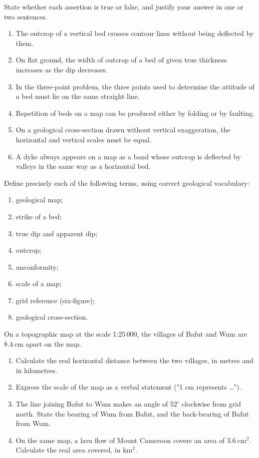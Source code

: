 \documentclass[11pt]{article}
\begin{document}
\begin{exercice}
State whether each assertion is true or false, and justify your answer in one or two sentences.
\begin{enumerate}
\item The outcrop of a vertical bed crosses contour lines without being deflected by them.
\item On flat ground, the width of outcrop of a bed of given true thickness increases as the dip decreases.
\item In the three-point problem, the three points used to determine the attitude of a bed must lie on the same straight line.
\item Repetition of beds on a map can be produced either by folding or by faulting.
\item On a geological cross-section drawn without vertical exaggeration, the horizontal and vertical scales must be equal.
\item A dyke always appears on a map as a band whose outcrop is deflected by valleys in the same way as a horizontal bed.
\end{enumerate}
\end{exercice}

\begin{exercice}[Definitions]
Define precisely each of the following terms, using correct geological vocabulary:
\begin{enumerate}
\item geological map;
\item strike of a bed;
\item true dip and apparent dip;
\item outcrop;
\item unconformity;
\item scale of a map;
\item grid reference (six-figure);
\item geological cross-section.
\end{enumerate}
\end{exercice}

\begin{exercice}
On a topographic map at the scale 1:25\,000, the villages of Bafut and Wum are $8.4\ \mathrm{cm}$ apart on the map.
\begin{enumerate}
\item Calculate the real horizontal distance between the two villages, in metres and in kilometres.
\item Express the scale of the map as a verbal statement ("1 cm represents \ldots").
\item The line joining Bafut to Wum makes an angle of $52^{\circ}$ clockwise from grid north. State the bearing of Wum from Bafut, and the back-bearing of Bafut from Wum.
\item On the same map, a lava flow of Mount Cameroon covers an area of $3.6\ \mathrm{cm^{2}}$. Calculate the real area covered, in $\mathrm{km^{2}}$.
\end{enumerate}
\end{exercice}
\end{document}
